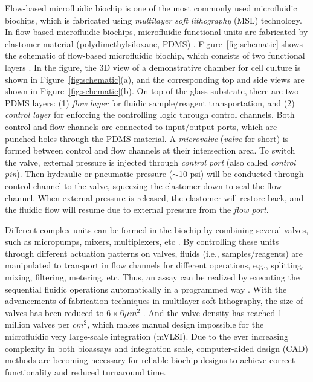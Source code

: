 \documentclass[journal]{IEEEtran}
\begin{document}
Flow-based microfluidic biochip is one of the most commonly used microfluidic biochips, which is fabricated using {\em multilayer soft lithography} (MSL) technology. 
In flow-based microfluidic biochips, microfluidic functional units are fabricated by elastomer material (polydimethylsiloxane, PDMS) \cite{Thorsen:2002ec,Rogers:2005vu}. 
Figure~\ref{fig:schematic} shows the schematic of flow-based microfluidic biochip, which consists of two functional layers \cite{QinRu:2016}. 
In the figure, the 3D view of a demonstrative chamber for cell culture is shown in Figure~\ref{fig:schematic}(a), and the corresponding top and side views are shown in Figure~\ref{fig:schematic}(b). 
On top of the glass substrate, there are two PDMS layers: (1) {\em flow layer} for fluidic sample/reagent transportation, and (2) {\em control layer} for enforcing the controlling logic through control channels. Both control and flow channels are connected to input/output ports, which are punched holes through the PDMS material.
A {\em microvalve} ({\em valve} for short) is formed between control and flow channels at their intersection area.
To switch the valve, external pressure is injected through {\em control port} (also called {\em control pin}). 
Then hydraulic or pneumatic pressure ($\sim$10 psi) will be conducted through control channel to the valve, squeezing the elastomer down to seal the flow channel. 
When external pressure is released, the elastomer will restore back, 
and the fluidic flow will resume due to external pressure from the {\em flow port}.

Different complex units can be formed in the biochip by combining several valves, such as micropumps, 
mixers, multiplexers, etc \cite{Mark:2010fk}. By controlling these units 
through different actuation patterns on valves, fluids (i.e., samples/reagents) are 
manipulated to transport in flow channels for different operations, 
e.g., splitting, mixing, filtering, metering, etc. Thus, an assay can be realized by executing 
the sequential fluidic operations automatically in a programmed way \cite{Squires:2005vb}.
With the advancements of fabrication techniques in multilayer soft 
lithography, the size of valves has been reduced to 
$6 \times 6\mu m^2$ \cite{Unger:2000gm,Araci:2012gl}. And the valve density 
has reached 1 million valves per $cm^2$, which makes manual design impossible
for the microfluidic very large-scale integration (mVLSI). 
Due to the ever increasing complexity in both bioassays and integration scale, 
computer-aided design (CAD) methods are becoming necessary 
for reliable biochip designs to achieve correct functionality and 
reduced turnaround time.
\end{document}
